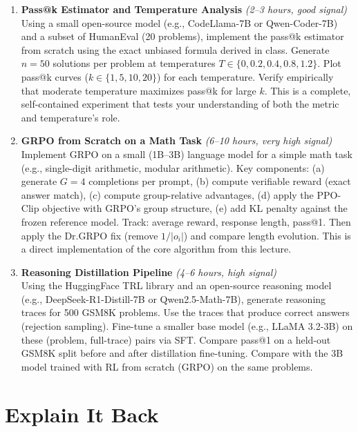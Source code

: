 \documentclass[11pt, a4paper]{article}
\begin{document}
\begin{enumerate}[leftmargin=2em]
  \item \textbf{Pass@k Estimator and Temperature Analysis} \textit{(2--3 hours, good signal)}\\
  Using a small open-source model (e.g., CodeLlama-7B or Qwen-Coder-7B) and a subset of HumanEval (20 problems), implement the pass@k estimator from scratch using the exact unbiased formula derived in class. Generate $n=50$ solutions per problem at temperatures $T \in \{0, 0.2, 0.4, 0.8, 1.2\}$. Plot pass@k curves ($k \in \{1, 5, 10, 20\}$) for each temperature. Verify empirically that moderate temperature maximizes pass@k for large $k$. This is a complete, self-contained experiment that tests your understanding of both the metric and temperature's role.

  \item \textbf{GRPO from Scratch on a Math Task} \textit{(6--10 hours, very high signal)}\\
  Implement GRPO on a small (1B--3B) language model for a simple math task (e.g., single-digit arithmetic, modular arithmetic). Key components: (a) generate $G=4$ completions per prompt, (b) compute verifiable reward (exact answer match), (c) compute group-relative advantages, (d) apply the PPO-Clip objective with GRPO's group structure, (e) add KL penalty against the frozen reference model. Track: average reward, response length, pass@1. Then apply the Dr.GRPO fix (remove $1/|o_i|$) and compare length evolution. This is a direct implementation of the core algorithm from this lecture.

  \item \textbf{Reasoning Distillation Pipeline} \textit{(4--6 hours, high signal)}\\
  Using the HuggingFace TRL library and an open-source reasoning model (e.g., DeepSeek-R1-Distill-7B or Qwen2.5-Math-7B), generate reasoning traces for 500 GSM8K problems. Use the traces that produce correct answers (rejection sampling). Fine-tune a smaller base model (e.g., LLaMA 3.2-3B) on these (problem, full-trace) pairs via SFT. Compare pass@1 on a held-out GSM8K split before and after distillation fine-tuning. Compare with the 3B model trained with RL from scratch (GRPO) on the same problems.
\end{enumerate}

\newpage
\section{Explain It Back}
\end{document}
